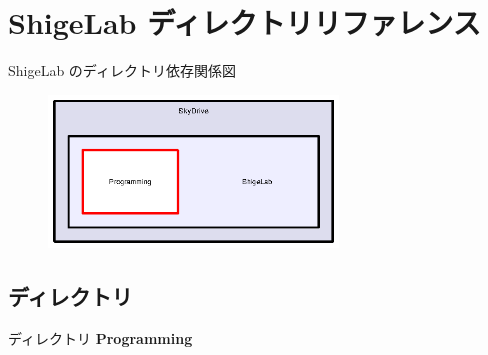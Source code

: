 \section{Shige\-Lab ディレクトリリファレンス}
\label{dir_a0d9d77de56eed61b71feb2adefbb47d}
Shige\-Lab のディレクトリ依存関係図\nopagebreak
\begin{figure}[H]
\begin{center}
\leavevmode
\includegraphics[width=218pt]{dir_a0d9d77de56eed61b71feb2adefbb47d_dep}
\end{center}
\end{figure}
\subsection*{ディレクトリ}
\begin{DoxyCompactItemize}
\item 
ディレクトリ {\bf Programming}
\end{DoxyCompactItemize}
